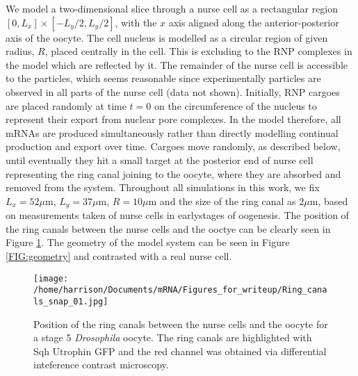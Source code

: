 \documentclass[twocolumn]{biophys}
\begin{document}
We model a two-dimensional slice through a nurse cell as a rectangular region $[0,L_x] \times [-L_y/2, L_y/2]$, with the $x$ axis aligned along the anterior-posterior axis of the oocyte.
The cell nucleus is modelled as a circular region of given radius, $R$, placed centrally in the cell. 
This is excluding to the RNP complexes in the model which are reflected by it.
The remainder of the nurse cell is accessible to the particles, which seems reasonable since experimentally particles are observed in all parts of the nurse cell (data not shown).
Initially, RNP cargoes are placed randomly at time $t=0$ on the circumference of the nucleus to represent their export from nuclear pore complexes.
In the model therefore, all mRNAs are produced simultaneously rather than directly modelling continual production and export over time.
Cargoes move randomly, as described below, until eventually they hit a small target at the posterior end of nurse cell representing the ring canal joining to the oocyte, where they are absorbed and removed from the system.
Throughout all simulations in this work, we fix $L_x=52 \mu \text{m}$, $L_y=37 \mu \text{m}$, $R=10 \mu \text{m}$ and the size of the ring canal as $2\mu \text{m}$, based on measurements taken of nurse cells in earlystages of oogenesis.
The position of the ring canals between the nurse cells and the ooctye can be clearly seen in Figure \ref{FIG:ring_canals}.
The geometry of the model system can be seen in Figure \ref{FIG:geometry} and contrasted with a real nurse cell.
\begin{figure}[h]
 \centering
 \texttt{[image: /home/harrison/Documents/mRNA/Figures\_for\_writeup/Ring\_canals\_snap\_01.jpg]}
 \caption{\small Position of the ring canals between the nurse cells and the oocyte for a stage 5 \textit{Drosophila} oocyte. The ring canals are highlighted with Sqh Utrophin GFP and the red channel was obtained via differential inteference contrast microscopy.}
 \label{FIG:ring_canals}
\end{figure}
\end{document}
